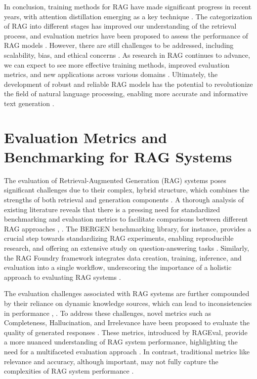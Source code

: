 \documentclass[conference]{IEEEtran}
\begin{document}
In conclusion, training methods for RAG have made significant progress in recent years, with attention distillation emerging as a key technique \cite{b15}. The categorization of RAG into different stages has improved our understanding of the retrieval process, and evaluation metrics have been proposed to assess the performance of RAG models \cite{b16}. However, there are still challenges to be addressed, including scalability, bias, and ethical concerns \cite{b17}. As research in RAG continues to advance, we can expect to see more effective training methods, improved evaluation metrics, and new applications across various domains \cite{b18}. Ultimately, the development of robust and reliable RAG models has the potential to revolutionize the field of natural language processing, enabling more accurate and informative text generation \cite{b19}.

\section{Evaluation Metrics and Benchmarking for RAG Systems}
The evaluation of Retrieval-Augmented Generation (RAG) systems poses significant challenges due to their complex, hybrid structure, which combines the strengths of both retrieval and generation components \cite{b1}. A thorough analysis of existing literature reveals that there is a pressing need for standardized benchmarking and evaluation metrics to facilitate comparisons between different RAG approaches \cite{b2}, \cite{b3}. The BERGEN benchmarking library, for instance, provides a crucial step towards standardizing RAG experiments, enabling reproducible research, and offering an extensive study on question-answering tasks \cite{b4}. Similarly, the RAG Foundry framework integrates data creation, training, inference, and evaluation into a single workflow, underscoring the importance of a holistic approach to evaluating RAG systems \cite{b5}.

The evaluation challenges associated with RAG systems are further compounded by their reliance on dynamic knowledge sources, which can lead to inconsistencies in performance \cite{b2}, \cite{b6}. To address these challenges, novel metrics such as Completeness, Hallucination, and Irrelevance have been proposed to evaluate the quality of generated responses \cite{b7}. These metrics, introduced by RAGEval, provide a more nuanced understanding of RAG system performance, highlighting the need for a multifaceted evaluation approach \cite{b7}. In contrast, traditional metrics like relevance and accuracy, although important, may not fully capture the complexities of RAG system performance \cite{b4}.
\end{document}
